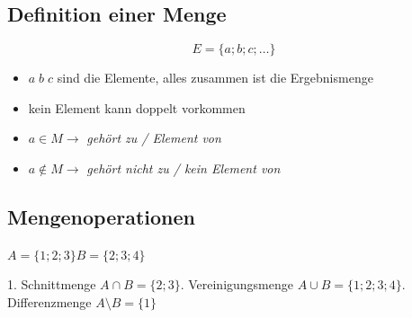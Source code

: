 \documentclass[a4paper, 15pt]{article}
\begin{document}
\subsection{Definition einer Menge}
\begin{equation*}
E = \{a;b;c;\dots\}
\end{equation*}
\begin{itemize}
\item $a\; b\; c$ sind die Elemente, alles zusammen ist die Ergebnismenge
\item kein Element kann doppelt vorkommen
\item $a \in M \longrightarrow$ \textit{gehört zu / Element von}
\item $a \notin M \longrightarrow$ \textit{gehört nicht zu / kein Element von}
\end{itemize}
\subsection{Mengenoperationen}
\hspace{3cm}$A=\{1;2;3\}$\hspace{6.3cm}$B=\{2;3;4\}$\newline\newline
\begin{minipage}[left]{0.5\textwidth}
1. Schnittmenge $A\cap B= \{2;3\}$\newline\newline\newline{}. Vereinigungsmenge $A\cup B = \{1;2;3;4\}$\newline\newline\newline{}. Differenzmenge $A\setminus B = \{1\}$
\end{minipage}
\end{document}
